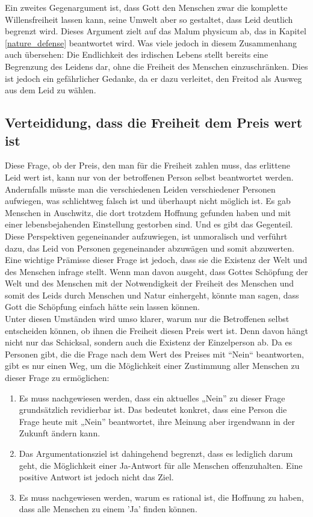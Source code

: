 Ein zweites Gegenargument ist, dass Gott den Menschen zwar die komplette Willensfreiheit lassen kann, seine Umwelt aber so gestaltet, dass Leid deutlich begrenzt wird. Dieses Argument zielt auf das Malum physicum ab, das in Kapitel \ref{nature_defense}  beantwortet wird. Was viele jedoch in diesem Zusammenhang auch übersehen: Die Endlichkeit des irdischen Lebens stellt bereits eine Begrenzung des Leidens dar, ohne die Freiheit des Menschen einzuschränken. Dies ist jedoch ein gefährlicher Gedanke, da er dazu verleitet, den Freitod als Ausweg aus dem Leid zu wählen.

\subsection{Verteididung, dass die Freiheit dem Preis wert ist} \label{Preis}
Diese Frage, ob der Preis, den man für die Freiheit zahlen muss, das erlittene Leid wert ist, kann nur von der betroffenen Person selbst beantwortet werden. Andernfalls müsste man die verschiedenen Leiden verschiedener Personen aufwiegen, was schlichtweg falsch ist und überhaupt nicht möglich ist. Es gab Menschen in Auschwitz, die dort trotzdem Hoffnung gefunden haben und mit einer lebensbejahenden Einstellung gestorben sind. Und es gibt das Gegenteil. Diese Perspektiven gegeneinander aufzuwiegen, ist unmoralisch und verführt dazu, das Leid von Personen gegeneinander abzuwägen und somit abzuwerten. \\

Eine wichtige Prämisse dieser Frage ist jedoch, dass sie die Existenz der Welt und des Menschen infrage stellt. Wenn man davon ausgeht, dass Gottes Schöpfung der Welt und des Menschen mit der Notwendigkeit der Freiheit des Menschen und somit des Leids durch Menschen und Natur einhergeht, könnte man sagen, dass Gott die Schöpfung einfach hätte sein lassen können. \\

Unter diesen Umständen wird umso klarer, warum nur die Betroffenen selbst entscheiden können, ob ihnen die Freiheit diesen Preis wert ist. Denn davon hängt nicht nur das Schicksal, sondern auch die Existenz der Einzelperson ab. Da es Personen gibt, die die Frage nach dem Wert des Preises mit ``Nein`` beantworten, gibt es nur einen Weg, um die Möglichkeit einer Zustimmung aller Menschen zu dieser Frage zu ermöglichen:
\begin{enumerate}
	\item Es muss nachgewiesen werden, dass ein aktuelles „Nein” zu dieser Frage grundsätzlich revidierbar ist. Das bedeutet konkret, dass eine Person die Frage heute mit „Nein” beantwortet, ihre Meinung aber irgendwann in der Zukunft ändern kann.
    \item Das Argumentationsziel ist dahingehend begrenzt, dass es lediglich darum geht, die Möglichkeit einer Ja-Antwort für alle Menschen offenzuhalten. Eine positive Antwort ist jedoch nicht das Ziel.
    \item Es muss nachgewiesen werden, warum es rational ist, die Hoffnung zu haben, dass alle Menschen zu einem 'Ja' finden können.
\end{enumerate}

